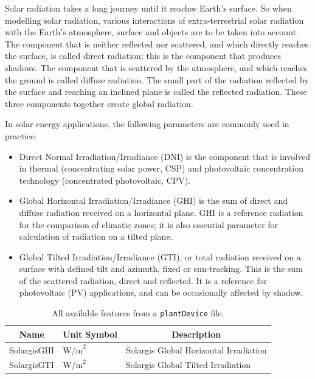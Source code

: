 Solar radiation takes a long journey until it reaches Earth’s surface. So when
modelling solar radiation, various interactions of extra-terrestrial solar
radiation with the Earth’s atmosphere, surface and objects are to be taken into
account\cite{solargis}. The component that is neither reflected nor scattered, and which
directly
reaches the surface, is called direct radiation; this is the component that
produces shadows. The component that is scattered by the atmosphere, and which
reaches the ground is called diffuse radiation. The small part of the radiation
reflected by the surface and reaching an inclined plane is called the reflected
radiation. These three components together create global radiation.

In solar energy applications, the following parameters are commonly used in
practice:

\begin{itemize}
	\item Direct Normal Irradiation/Irradiance (DNI) is the component that is
	      involved in thermal (concentrating solar power, CSP) and photovoltaic
	      concentration
	      technology (concentrated photovoltaic, CPV)\cite{solargis}.
	\item  Global Horizontal
	      Irradiation/Irradiance (GHI) is the sum of direct and diffuse radiation
	      received on a horizontal plane. GHI is a reference radiation for the
	      comparison of climatic zones; it is also essential parameter for
	      calculation of radiation on a tilted plane\cite{solargis}.
	\item Global Tilted Irradiation/Irradiance (GTI), or total
	      radiation received on a surface with defined tilt and azimuth, fixed or
	      sun-tracking. This is the sum of the scattered radiation, direct and
	      reflected. It is a reference for photovoltaic (PV) applications, and
	      can be occasionally affected by shadow\cite{solargis}.
\end{itemize}


\begin{table}[H]
	\begin{center}
		\begin{tabular}[c]{l|l|l}
			\multicolumn{1}{c|}{\textbf{Name}}        &
			\multicolumn{1}{c|}{\textbf{Unit Symbol}} &
			\multicolumn{1}{c}{\textbf{Description}}                                                            \\
			\hline
			SolargisGHI                               & $\text{W/m}^2$ & Solargis Global Horizontal Irradiation \\
			SolargisGTI                               & $\text{W/m}^2$ & Solargis Global Tilted Irradiation     \\
		\end{tabular}
		\caption{All available features from a \texttt{plantDevice} file.}\label{tab:solargisfeatures}
	\end{center}
\end{table}

